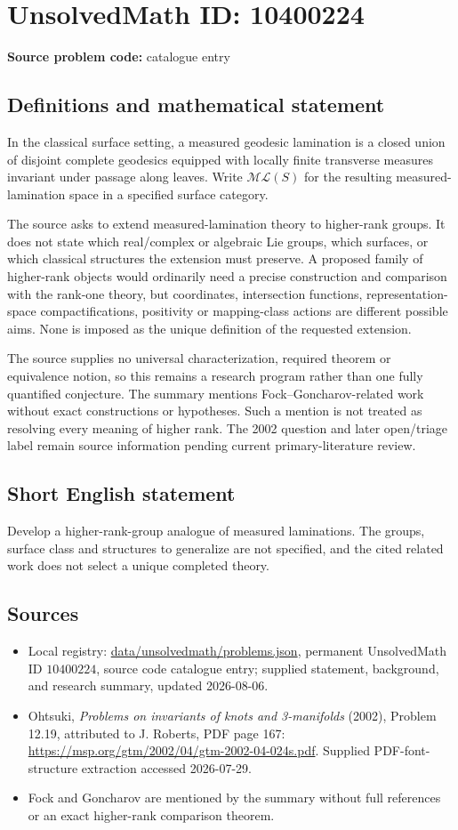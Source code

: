 \documentclass[11pt]{article}
\begin{document}
\section*{UnsolvedMath ID: 10400224}
\textbf{Source problem code:} catalogue entry
\subsection{Definitions and mathematical statement}
In the classical surface setting, a measured geodesic lamination is a closed union of disjoint complete geodesics equipped with locally finite transverse measures invariant under passage along leaves. Write \(\mathcal{ML}(S)\) for the resulting measured-lamination space in a specified surface category.

The source asks to extend measured-lamination theory to higher-rank groups. It does not state which real/complex or algebraic Lie groups, which surfaces, or which classical structures the extension must preserve. A proposed family of higher-rank objects would ordinarily need a precise construction and comparison with the rank-one theory, but coordinates, intersection functions, representation-space compactifications, positivity or mapping-class actions are different possible aims. None is imposed as the unique definition of the requested extension.

The source supplies no universal characterization, required theorem or equivalence notion, so this remains a research program rather than one fully quantified conjecture. The summary mentions Fock--Goncharov-related work without exact constructions or hypotheses. Such a mention is not treated as resolving every meaning of higher rank. The 2002 question and later open/triage label remain source information pending current primary-literature review.
\subsection{Short English statement}
Develop a higher-rank-group analogue of measured laminations. The groups, surface class and structures to generalize are not specified, and the cited related work does not select a unique completed theory.
\subsection{Sources}
\begin{itemize}
\item Local registry: \url{data/unsolvedmath/problems.json}, permanent UnsolvedMath ID \(10400224\), source code catalogue entry; supplied statement, background, and research summary, updated 2026-08-06.
\item Ohtsuki, \emph{Problems on invariants of knots and 3-manifolds} (2002), Problem 12.19, attributed to J. Roberts, PDF page 167: \url{https://msp.org/gtm/2002/04/gtm-2002-04-024s.pdf}. Supplied PDF-font-structure extraction accessed 2026-07-29.
\item Fock and Goncharov are mentioned by the summary without full references or an exact higher-rank comparison theorem.
\end{itemize}
\end{document}
